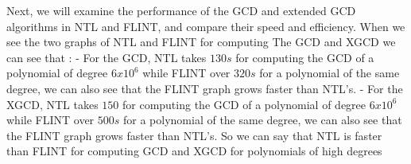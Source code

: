 \newline
\newline Next, we will examine the performance of the GCD and extended GCD algorithms in NTL and FLINT, and compare their speed and efficiency.
\newline When we see the two graphs of NTL and FLINT for computing The GCD and XGCD we can see that :
\newline - For the GCD, NTL takes $130s$ for computing the GCD of a polynomial of degree $6x10^6$ while FLINT over $320s$ for a polynomial of the same degree, we can also see that the FLINT graph grows faster than NTL's.
\newline - For the XGCD, NTL takes $150$ for computing the GCD of a polynomial of degree $6x10^6$ while FLINT over $500s$ for a polynomial of the same degree, we can also see that the FLINT graph grows faster than NTL's.
\newline So we can say that NTL is faster than FLINT for computing GCD and XGCD for polynomials of high degrees
